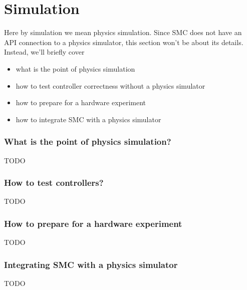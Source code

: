 \chapter{Simulation}
Here by simulation we mean physics simulation. 
Since SMC does not have an API connection to a physics simulator,
this section won't be about its details.
Instead, we'll briefly cover 
\begin{itemize}
		\item what is the point of physics simulation
		\item how to test controller correctness without a physics simulator
		\item how to prepare for a hardware experiment
		\item how to integrate SMC with a physics simulator
\end{itemize}

\subsection{What is the point of physics simulation?}
TODO

\subsection{How to test controllers?}
TODO


\subsection{How to prepare for a hardware experiment}
TODO

\subsection{Integrating SMC with a physics simulator}
TODO
